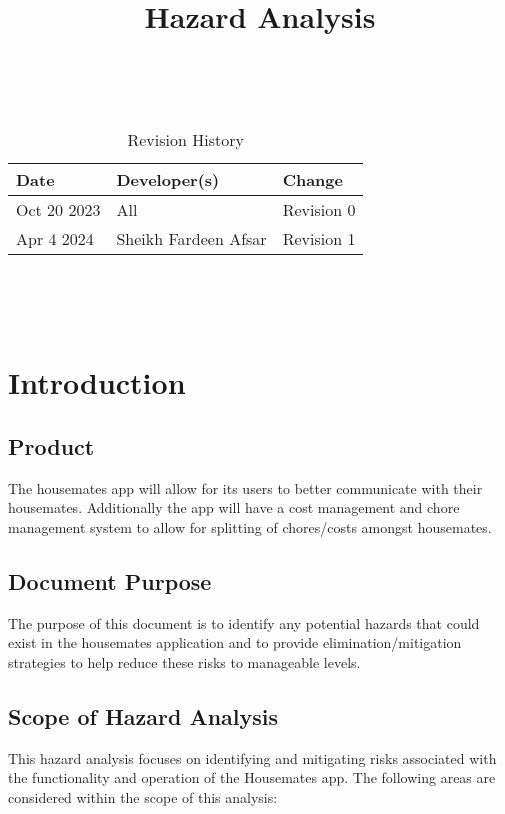 \documentclass{article}
\title{Hazard Analysis\\\progname}
\author{\authname}
\date{}
\begin{document}
\maketitle
\thispagestyle{empty}

~\newpage


\begin{table}[hp]
\caption{Revision History} \label{TblRevisionHistory}
\begin{tabularx}{\textwidth}{llX}
\toprule
\textbf{Date} & \textbf{Developer(s)} & \textbf{Change}\\
\midrule
Oct 20 2023 & All & Revision 0\\
Apr 4 2024 & Sheikh Fardeen Afsar & Revision 1\\
\bottomrule
\end{tabularx}
\end{table}

~\newpage

\tableofcontents

~\newpage



\section{Introduction}

\subsection{Product}
The housemates app will allow for its users to better communicate with their housemates.  Additionally the app will have a cost management and chore management system to allow for splitting of chores/costs amongst housemates.

\subsection{Document Purpose}
The purpose of this document is to identify any potential hazards that could exist in the housemates application and to provide elimination/mitigation strategies to help reduce these risks to manageable levels.

\subsection{Scope of Hazard Analysis}
This hazard analysis focuses on identifying and mitigating risks associated with the functionality and operation of the Housemates app. The following areas are considered within the scope of this analysis:
\end{document}
